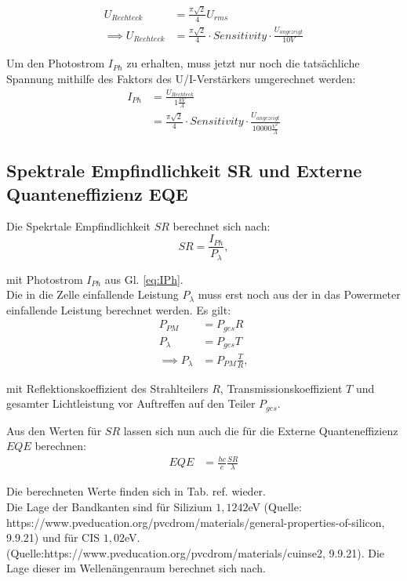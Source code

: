 \begin{align}
U_{Rechteck} &= \frac{\pi \sqrt{2}}{4} U_{rms} \\
\implies U_{Rechteck} &= \frac{\pi \sqrt{2}}{4} \cdot Sensitivity \cdot \frac{U_{angezeigt}}{10V}
\end{align}

Um den Photostrom $I_{Ph}$ zu erhalten, muss jetzt nur noch die tatsächliche Spannung mithilfe des Faktors des U/I-Verstärkers umgerechnet werden:\\

\begin{align}
I_{Ph} &= \frac{U_{Rechteck}}{1 \frac{kV}{A}} \nonumber \\
 &= \frac{\pi \sqrt{2}}{4} \cdot Sensitivity \cdot \frac{U_{angezeigt}}{10000 \frac{V^2}{A}}
\label{eq:IPh}
\end{align}


\subsection{Spektrale Empfindlichkeit SR und Externe Quanteneffizienz EQE}

Die Spekrtale Empfindlichkeit $SR$ berechnet sich nach:
\begin{equation}
SR = \frac{I_{Ph}}{P_\lambda},
\end{equation}

mit Photostrom $I_{Ph}$ aus Gl. \ref{eq:IPh}. \\
Die in die Zelle einfallende Leistung $P_{\lambda}$ muss erst noch aus der in das Powermeter einfallende Leistung berechnet werden. Es gilt:
\begin{align}
P_{PM} &= P_{ges} R \nonumber \\
P_{\lambda} &= P_{ges} T \nonumber \\
\implies P_{\lambda} &= P_{PM} \frac{T}{R},
\end{align}

mit Reflektionskoeffizient des Strahlteilers $R$, Transmissionskoeffizient $T$ und gesamter Lichtleistung vor Auftreffen auf den Teiler $P_{ges}$.

Aus den Werten für $SR$ lassen sich nun auch die für die Externe Quanteneffizienz $EQE$ berechnen:
\begin{align}
EQE &= \frac{hc}{e} \frac{SR}{\lambda}
\label{eq:eqe}
\end{align}

Die berechneten Werte finden sich in Tab. ref. wieder.
\\
Die Lage der Bandkanten sind für Silizium $1,1242$eV (Quelle: https://www.pveducation.org/pvcdrom/materials/general-properties-of-silicon, 9.9.21) und für CIS $1,02$eV. (Quelle:https://www.pveducation.org/pvcdrom/materials/cuinse2, 9.9.21). Die Lage dieser im Wellenängenraum berechnet sich nach. \\

